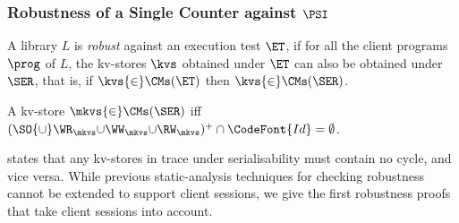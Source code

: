 

\subsubsection{Robustness of a Single Counter against $\PSI$}

A library $L$ is \emph{robust} against an execution test $\ET$,
if for all the client programs \( \prog \) of $L$, 
the kv-stores \( \kvs \) obtained under $\ET$ can also be obtained under $\SER$,
that is, if \( \kvs {\in} \CMs(\ET) \) then \( \kvs {\in} \CMs(\SER) \).

\spaceshrink{-2pt}
\begin{theorem}
\label{thm:serialisable_nocycle}
A kv-store $\mkvs {\in} \CMs(\SER)$ iff $(\SO {\cup} \WR_{\mkvs} 
{\cup} \WW_{\mkvs} {\cup} \RW_{\mkvs})^{+} \cap \CodeFont{Id} = \emptyset$.%
\end{theorem}
\spaceshrink{-2pt}

\noindent
{} states that any kv-stores in trace under serialisability must contain no cycle, and vice versa.
While previous static-analysis techniques for checking robustness \citep{giovanni_concur16,SIanalysis,laws,sureshConcur}
cannot be extended to support client sessions, 
we give the first robustness proofs that take client sessions into account.

